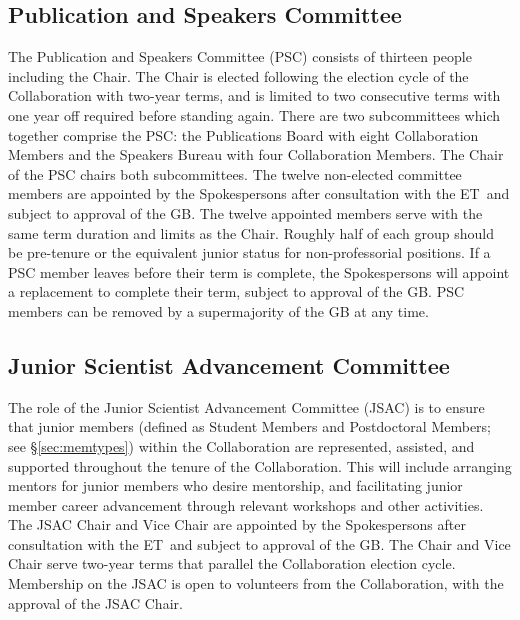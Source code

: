 \documentclass[12pt]{article}
\newcommand{\exec}{{Executive Team}}
\newcommand{\shorte}{{ET}}  %
\begin{document}
\subsection{Publication and Speakers  Committee}
\label{sec:pubcouncil}
The Publication and Speakers Committee (PSC) consists of thirteen people including the Chair. The Chair is elected following the election cycle of the Collaboration with  two-year terms, and is limited to two consecutive terms with one year off required before standing again. There are two subcommittees which together comprise the PSC: the Publications Board with eight Collaboration Members and the Speakers Bureau with four Collaboration Members. The Chair of the PSC chairs both subcommittees. The twelve non-elected committee members are appointed by the Spokespersons after consultation with the \shorte\ and subject to approval of the GB.  %
The twelve appointed members serve with the same term duration and limits as the Chair. Roughly half of each group should be pre-tenure or the equivalent junior status for non-professorial positions. If a PSC member leaves before their term is complete, the Spokespersons
will appoint a replacement to complete their term, subject to approval of the GB. PSC members can be removed by a supermajority of the GB at any time.  
 




\subsection{Junior Scientist Advancement Committee}

The role of the Junior Scientist Advancement Committee (JSAC) is to ensure that junior members (defined as Student Members and Postdoctoral Members; see \S\ref{sec:memtypes}) within the Collaboration are represented, assisted, and supported throughout the  tenure of the Collaboration. This will include arranging mentors for junior members who desire mentorship, and facilitating junior member career advancement through relevant workshops and other activities. The JSAC Chair and Vice Chair are appointed by the Spokespersons after consultation with the \shorte\ and subject to approval of the GB.  %
The Chair and Vice Chair serve two-year terms that parallel the Collaboration election cycle. Membership on the JSAC is open to volunteers from the Collaboration, with the approval of the JSAC Chair. 
\end{document}

